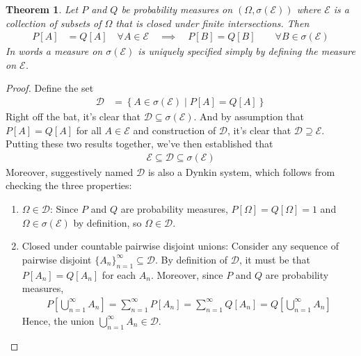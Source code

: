 \documentclass[12pt]{article}
\theoremstyle{plain}
\newtheorem{thm}{Theorem}[section]
\theoremstyle{definition}
\theoremstyle{remark}
\newcommand{\sE}{\mathscr{E}}
\newcommand{\sD}{\mathscr{D}}
\newcommand{\sumninf}{\sum^\infty_{n=1}}
\newcommand{\ninf}{_{n=1}^\infty}
\begin{document}
\begin{thm}
\label{thm:PQunq}
Let $P$ and $Q$ be probability measures on $(\Omega,\sigma(\sE))$ where
$\sE$ is a collection of subsets of $\Omega$ that is closed under finite
intersections. Then
\begin{align*}
  P[A] &= Q[A]
  \quad\forall A\in\sE
  \quad\implies\quad
  P[B] = Q[B]
  \qquad \forall B\in\sigma(\sE)
\end{align*}
In words a measure on $\sigma(\sE)$ is \emph{uniquely} specified simply
by defining the measure on $\sE$.
\end{thm}
\begin{proof}
Define the set
\begin{align*}
  \sD &= \left\{ A\in\sigma(\sE) \;|\; P[A]=Q[A]  \right\}
\end{align*}
Right off the bat, it's clear that $\sD\subseteq \sigma(\sE)$. And
by assumption that $P[A]=Q[A]$ for all $A\in \sE$ and construction of
$\sD$, it's clear that $\sD\supseteq \sE$. Putting these two results
together, we've then established that
\begin{align}
  \sE \subseteq \sD \subseteq \sigma(\sE)
  \label{Dsqueeze}
\end{align}
Moreover, suggestively named $\sD$ is also a Dynkin system, which
follows from checking the three properties:
\begin{enumerate}
  \item $\Omega\in\sD$: Since $P$ and $Q$ are probability measures,
    $P[\Omega]=Q[\Omega]=1$ and $\Omega\in\sigma(\sE)$ by definition, so
    $\Omega\in\sD$.
  \item Closed under countable pairwise disjoint unions:
    Consider any sequence of pairwise disjoint $\{A_n\}\ninf\subseteq
    \sD$.  By definition of $\sD$, it must be that $P[A_n]=Q[A_n]$ for
    each $A_n$. Moreover, since $P$ and $Q$ are probability measures,
    \begin{align*}
      P\left[\bigcup\ninf A_n\right]
      =
      \sumninf P\left[A_n\right]
      =
      \sumninf Q\left[A_n\right]
      =
      Q\left[\bigcup\ninf A_n\right]
    \end{align*}
    Hence, the union $\bigcup\ninf A_n\in \sD$.


\end{enumerate}
\end{proof}
\end{document}
